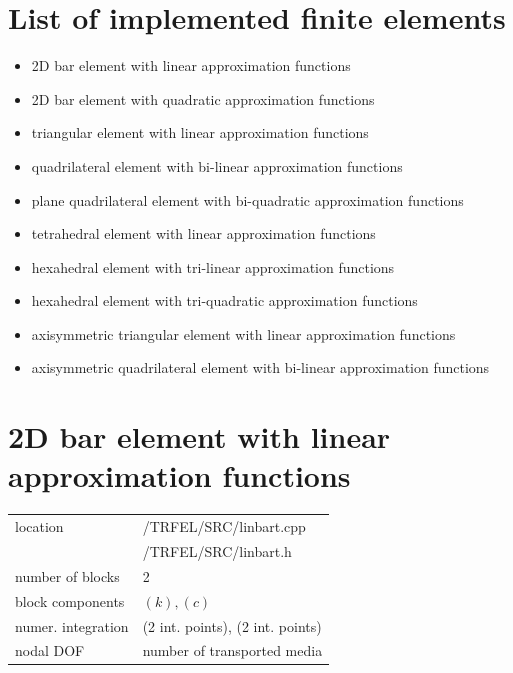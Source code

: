 \section{List of implemented finite elements}
\label{secfemlist}
\begin{itemize}
\item{2D bar element with linear approximation functions}
\item{2D bar element with quadratic approximation functions}
\item{triangular element with linear approximation functions}
\item{quadrilateral element with bi-linear approximation functions}
\item{plane quadrilateral element with bi-quadratic approximation functions}
\item{tetrahedral element with linear approximation functions}
\item{hexahedral element with tri-linear approximation functions}
\item{hexahedral element with tri-quadratic approximation functions}
\item{axisymmetric triangular element with linear approximation functions}
\item{axisymmetric quadrilateral element with bi-linear approximation functions}
\end{itemize}

\section{2D bar element with linear approximation functions}
\label{linbart}

\begin{center}
\begin{tabular}{|l|l|}
\hline
location & /TRFEL/SRC/linbart.cpp\\
         & /TRFEL/SRC/linbart.h
\\ \hline
number of blocks & 2
\\ \hline
block components & $(k), (c)$
\\ \hline
numer. integration & (2 int. points), (2 int. points)
\\ \hline
nodal DOF & number of transported media
\\ \hline
\end{tabular}
\end{center}

